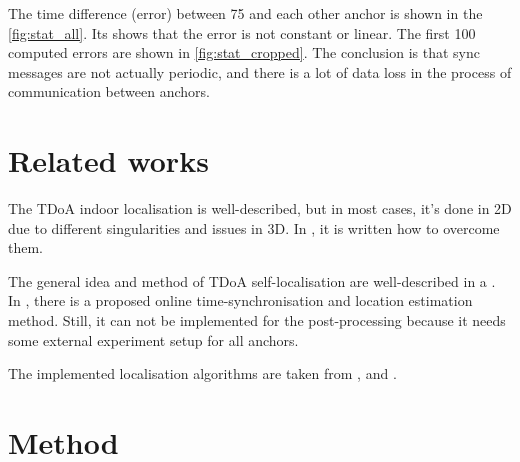 \documentclass[journal]{IEEEtran}
\begin{document}
The time difference (error) between 75 and each other anchor is shown in the \autoref{fig:stat_all}. Its shows that the error is not constant or linear. The first 100 computed errors are shown in \autoref{fig:stat_cropped}. The conclusion is that sync messages are not actually periodic, and there is a lot of data loss in the process of communication between anchors.

\section{Related works}
\label{sec:ps}
The TDoA indoor localisation is well-described, but in most cases, it's done in 2D due to different singularities and issues in 3D. In \cite{Laaraiedh2009}, it is written how to overcome them. 

The general idea and method of TDoA self-localisation are well-described in a \cite{Keefe2017}. 
In \cite{Yuzan2019}, there is a proposed online time-synchronisation and location estimation method. 
Still, it can not be implemented for the post-processing because it needs some external experiment setup for all anchors.

The implemented localisation algorithms are taken from \cite{Weng2011}, and \cite{Yuzan2019}.

\section{Method}
\label{sec:method}
\end{document}
